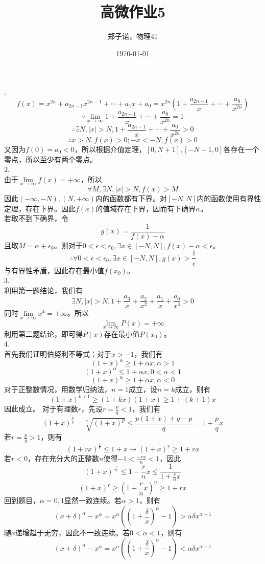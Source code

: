 \documentclass[utf8]{ctexart}
\title{高微作业5}
\author{郑子诺，物理41}
\date{\today}
\begin{document}
\maketitle
{}.\\
\[f(x)=x^{2n}+a_{2n-1}x^{2n-1}+\cdots+a_1x+a_0=x^{2n}(1+\frac{a_{2n-1}}{x}+\cdots+\frac{a_0}{x^{2n}})\]
\[\because\lim\limits_{x\rightarrow\infty}1+\frac{a_{2n-1}}{x}+\cdots+\frac{a_0}{x^{2n}}=1\]
\[\therefore\exists N,|x|>N,1+\frac{a_{2n-1}}{x}+\cdots+\frac{a_0}{x^{2n}}>0\]
\[\therefore x>N,f(x)>0;-x<-N,f(x)>0\]
又因为$f(0)=a_0<0$，所以根据介值定理，$[0,N+1],[-N-1,0]$各存在一个零点，所以至少有两个零点。\\
2.\\
由于$\lim\limits_{x\rightarrow\infty}f(x)=+\infty$，所以
\[\forall M,\exists N,|x|>N,f(x)>M\]
因此$(-\infty,-N),(N,+\infty)$内的函数都有下界。对$[-N,N]$内的函数使用有界性定理，存在下界。因此$f(x)$的值域存在下界，因而有下确界$\alpha$。\\
若取不到下确界，令
\[g(x)=\frac{1}{f(x)-\alpha}\]
且取$M=\alpha+\epsilon_0$。则对于$0<\epsilon<\epsilon_0,\exists x\in[-N,N],f(x)-\alpha<\epsilon$。
\[\therefore\forall0<\epsilon<\epsilon_0,\exists x\in[-N,N],g(x)>\frac{1}{\epsilon}\]
与有界性矛盾，因此存在最小值$f(x_0)$。\\
3.\\
利用第一题结论，我们有
\[\exists N,|x|>N,1+\frac{a_3}{x}+\frac{a_2}{x^2}+\frac{a_1}{x}+\frac{a_0}{x^4}>0\]
同时$\lim\limits_{x\rightarrow\infty}x^4=+\infty$。所以
\[\lim\limits_{x\rightarrow\infty}P(x)=+\infty\]
利用第二题结论，即可得$P(x)$存在最小值$P(x_0)$。\\
4.\\
首先我们证明伯努利不等式：对于$x>-1$，我们有
\[(1+x)^\alpha\ge1+\alpha x,\alpha>1\]
\[(1+x)^\alpha\le1+\alpha x,0<\alpha<1\]
\[(1+x)^\alpha\ge1+\alpha x,\alpha<0\]
对于正整数情况，用数学归纳法，$n=1$成立，设$n=k$成立，则有
\[(1+x)^{k+1}\ge(1+kx)(1+x)\ge1+(k+1)x\]
因此成立。
对于有理数$r$，先设$r=\frac{p}{q}<1$，我们有
\[(1+x)^\frac{p}{q}=\sqrt[q]{(1+x)^p}\le\frac{p(1+x)+q-p}{q}=1+\frac{p}{q}x\]
若$r=\frac{p}{q}>1$，则有
\[(1+rx)^\frac{1}{r}\le1+x\rightarrow(1+x)^r\ge1+rx\]
若$r<0$，存在充分大的正整数$n$使得$-1<\frac{-rx}{n}<1$，因此
\[(1+x)^\frac{-r}{n}\le1-\frac{r}{n}x\le\frac{1}{1+\frac{r}{n}x}\]
\[(1+x)^r\ge(1+\frac{r}{n}x)^n\ge1+rx\]
回到题目，$\alpha=0,1$显然一致连续。若$\alpha>1$，则有
\[(x+\delta)^\alpha-x^\alpha=x^\alpha((1+\frac{\delta}{x})^\alpha-1)>\alpha\delta x^{\alpha-1}\]
随$x$递增趋于无穷，因此不一致连续。若$0<\alpha<1$，则有
\[(x+\delta)^\alpha-x^\alpha=x^\alpha((1+\frac{\delta}{x})^\alpha-1)<\alpha\delta x^{\alpha-1}\]
\end{document}
